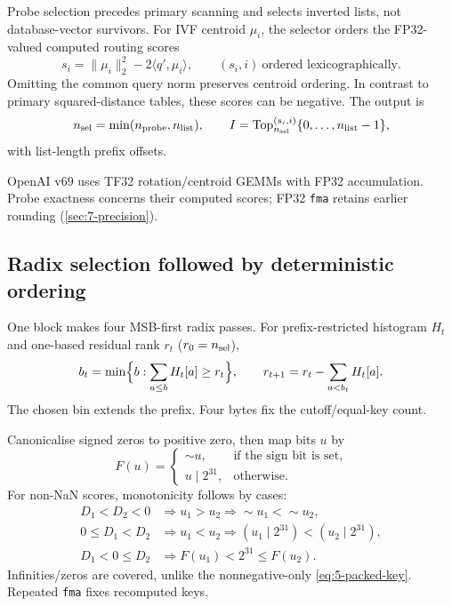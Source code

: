 Probe selection precedes primary scanning and selects inverted lists,
not database-vector survivors. For IVF centroid $\mu_i$, the selector
orders the FP32-valued computed routing scores
\begin{equation}
 s_i=\|\mu_i\|_2^2-2\langle q',\mu_i\rangle,
 \qquad (s_i,i)\ \text{ordered lexicographically}.
 \label{eq:5-probe-score}
\end{equation}
Omitting the common query norm preserves centroid ordering. In contrast
to primary squared-distance tables, these scores can be negative. The output is
\[
 n_{\rm sel}=\min(n_{\rm probe},n_{\rm list}),\qquad
 I=\operatorname{Top}^{(s_i,i)}_{n_{\rm sel}}\{0,\ldots,n_{\rm list}-1\},
\]
with list-length prefix offsets.

OpenAI v69 uses TF32 rotation/centroid GEMMs with FP32 accumulation. Probe exactness concerns their computed scores; FP32 \texttt{fma} retains earlier rounding (\cref{sec:7-precision}).

\subsection{Radix selection followed by deterministic ordering}

One block makes four MSB-first radix passes. For prefix-restricted histogram $H_t$ and one-based residual rank $r_t$ ($r_0=n_{\rm sel}$),
\[
 b_t=\min\Bigl\{b:\sum_{a\leq b}H_t[a]\geq r_t\Bigr\},\qquad
 r_{t+1}=r_t-\sum_{a<b_t}H_t[a].
\]
The chosen bin extends the prefix. Four bytes fix the cutoff/equal-key count.

Canonicalise signed zeros to positive zero, then map bits $u$ by
\begin{equation}
 F(u)=\begin{cases}
       \mathop{\sim}u,&\text{if the sign bit is set},\\
       u\mathbin{|}2^{31},&\text{otherwise}.
      \end{cases}
 \label{eq:5-probe-key}
\end{equation}
For non-NaN scores, monotonicity follows by cases:
\[
 \begin{aligned}
 D_1<D_2<0&\Rightarrow u_1>u_2\Rightarrow{\sim}u_1<{\sim}u_2,\\
 0\leq D_1<D_2&\Rightarrow u_1<u_2\Rightarrow
 (u_1\mathbin{|}2^{31})<(u_2\mathbin{|}2^{31}),\\
 D_1<0\leq D_2&\Rightarrow F(u_1)<2^{31}\leq F(u_2).
 \end{aligned}
\]
Infinities/zeros are covered, unlike the nonnegative-only \cref{eq:5-packed-key}. Repeated \texttt{fma} fixes recomputed keys.

